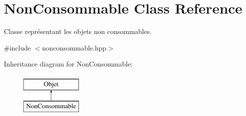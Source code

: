 \hypertarget{class_non_consommable}{\section{Non\-Consommable Class Reference}
\label{class_non_consommable}
}


Classe représentant les objets non consommables.  




{\ttfamily \#include $<$nonconsommable.\-hpp$>$}

Inheritance diagram for Non\-Consommable\-:\begin{figure}[H]
\begin{center}
\leavevmode
\includegraphics[height=2.000000cm]{class_non_consommable}
\end{center}
\end{figure}
